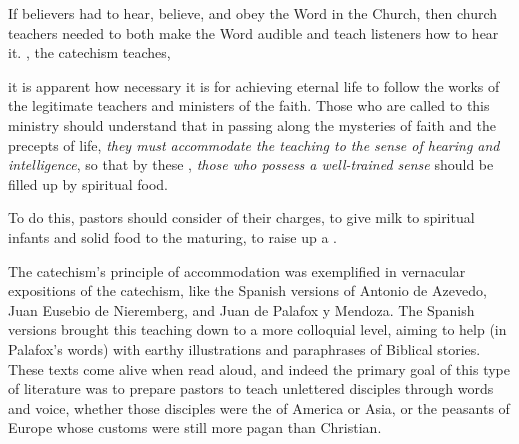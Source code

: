 If believers had to hear, believe, and obey the Word in the Church, then church
teachers needed to both make the Word audible and teach listeners how to hear
it. 
, the
catechism teaches, 
\begin{quoting}
    it is apparent how necessary it is for achieving eternal life to follow the
    works of the legitimate teachers and ministers of the faith. 
    \Dots{} Those who are called to this ministry should understand that in
    passing along the mysteries of faith and the precepts of life, \emph{they
    must accommodate the teaching to the sense of hearing and intelligence}, so
    that by these , \emph{those who possess a
    well-trained sense} should be filled up by spiritual food.%
        \Autocite[2, 8--9 (emphasis added)]{Catholic:Catechismus1614}
\end{quoting}
To do this, pastors should consider  of their charges, to give milk to
spiritual infants and solid food to the maturing, to raise up a .%
    \Autocite[8]{Catholic:Catechismus1614}

The catechism's principle of accommodation was exemplified in vernacular
expositions of the catechism, like the Spanish versions of Antonio de Azevedo,
Juan Eusebio de Nieremberg, and Juan de Palafox y Mendoza.%
    \Autocites{Azevedo:Catecismo}{Nieremberg:PracticaCatecismo}{Palafox:Bocados}
The Spanish versions brought this teaching down to a more colloquial level,
aiming to help  (in Palafox's words) with
earthy illustrations and paraphrases of Biblical stories.
These texts come alive when read aloud, and indeed the primary goal of this type
of literature was to prepare pastors to teach unlettered disciples through words
and voice, whether those disciples were the  of America or Asia,
or the peasants of Europe whose customs were still more pagan than Christian.%
    \Autocite
    [On Europe as a mission front after Trent, see][60--63]
    {Kamen:EarlyModernSociety}


